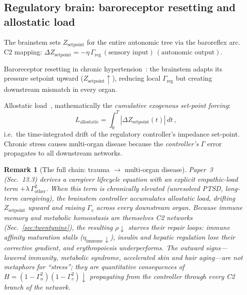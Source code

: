 \documentclass[aps,pre,twocolumn,superscriptaddress,floatfix]{revtex4-2}
\newtheorem{remark}{Remark}
\begin{document}
\subsection{Regulatory brain: baroreceptor resetting and
allostatic load}

The brainstem sets $Z_{\text{setpoint}}$ for the
entire autonomic tree via the baroreflex arc.
C2 mapping:
$\Delta Z_{\text{setpoint}} = -\eta\,\Gamma_{\text{reg}}
\,(\text{sensory input})\,(\text{autonomic output})$.

Baroreceptor resetting in chronic
hypertension~\cite{Chapleau1991}:
the brainstem adapts its pressure setpoint upward
($Z_{\text{setpoint}} \uparrow$), reducing local
$\Gamma_{\text{reg}}$ but creating downstream mismatch
in every organ.

Allostatic load~\cite{McEwen1998},
mathematically the \emph{cumulative exogenous
set-point forcing}:
\begin{equation}
  L_{\text{allostatic}} = \int_0^T
  |\Delta Z_{\text{setpoint}}(t)|\,dt\,,
\end{equation}
i.e.\ the time-integrated drift of the regulatory
controller's impedance set-point.
Chronic stress causes multi-organ disease because
the \emph{controller's} $\Gamma$ error propagates
to all downstream networks.

\begin{remark}[The full chain: trauma $\to$ multi-organ disease]
\label{rem:trauma-somatic}
Paper~3 (Sec.~13.3) derives a caregiver lifecycle equation
with an explicit empathic-load term
$+\lambda\,\Gamma_{\text{other}}^2$.
When this term is chronically elevated (unresolved PTSD,
long-term caregiving), the brainstem controller
accumulates allostatic load, drifting
$Z_{\text{setpoint}}$ upward and raising
$\Gamma_v$ across every downstream organ.
Because immune memory and metabolic homeostasis are
themselves C2 networks
(Sec.~\ref{sec:twentynine}),
the resulting $\rho\!\downarrow$ starves their
repair loops:
immune affinity maturation stalls
($\eta_{\text{immune}}\!\downarrow$),
insulin and hepatic regulation lose their corrective
gradient, and erythropoiesis underperforms.
The outward signs---lowered immunity, metabolic syndrome,
accelerated skin and hair aging---are not metaphors for
``stress''; they are quantitative consequences of
$H = (1-\Gamma_n^2)(1-\Gamma_v^2)\!\downarrow$
propagating from the controller through every C2
branch of the network.
\end{remark}


\end{document}
